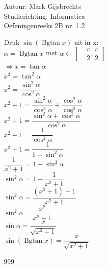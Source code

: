 \documentclass[a4paper]{article}
\newcommand{\Bgtan}{\operatorname{Bgtan}}
\begin{document}
\noindent \large Auteur: Mark Gijsbrechts \\
\noindent \large Studierichting: Informatica\\
\noindent \large Oefeningenreeks 2B nr. 1.2\\

\medskip

\normalsize



Druk $\sin(\Bgtan x)$ uit in x:\\

$\alpha = \Bgtan x$ met $\alpha \in \left] -\dfrac{\pi}{2}, \dfrac{\pi}{2} \right[$ \\

$\Leftrightarrow x = \tan \alpha$  \\

$x^2 = \tan^2 \alpha$ \\

$x^2 = \dfrac{\sin^2 \alpha}{\cos^2 \alpha}$ \\

$x^2 + 1 = \dfrac{\sin^2 \alpha}{\cos^2 \alpha} + \dfrac{\cos^2 \alpha}{\cos^2 \alpha}$ \\

$x^2 + 1 = \dfrac{\sin^2 \alpha + \cos^2 \alpha}{\cos^2 \alpha}$ \\

$x^2 + 1 = \dfrac{1}{\cos^2 \alpha}$ \\

$x^2 + 1 = \dfrac{1}{1 - \sin^2 \alpha}$ \\

$\dfrac{1}{x^2 + 1} = 1 - \sin^2 \alpha$ \\

$ \sin^2 \alpha = 1 - \dfrac{1}{x^2 + 1}$ \\

$ \sin^2 \alpha = \dfrac{(x^2 + 1) - 1}{x^2 + 1}$ \\

$ \sin^2 \alpha = \dfrac{x^2}{x^2 + 1}$ \\

$ \sin \alpha = \dfrac{x}{\sqrt{x^2 + 1}}$ \\

$ \sin(\Bgtan x) = \dfrac{x}{\sqrt{x^2 + 1}}$ \\

\begin{thebibliography}{999}
\end{thebibliography}
\end{document}
